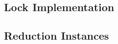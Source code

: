 



\subsection{Lock Implementation}
\label{subsec:lockimpl}

\subsection{Reduction Instances}
\label{subsec:reducimpl}
